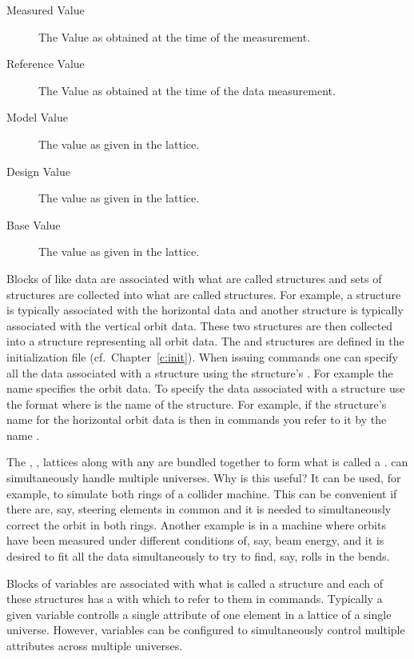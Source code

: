 \begin{description}
\begin{description}
\item[Measured Value] 
The Value as obtained at the time of the  measurement.
\item[Reference Value] 
The Value as obtained at the time of the  data  measurement.
\item[Model Value]
The value as given in the  lattice.
\item[Design Value]
The value as given in the  lattice.
\item[Base Value]
The value as given in the  lattice.
\end{description}
\end{description}

Blocks of like data are associated with what are called 
structures and sets of  structures are collected into what
are called  structures. For example, a 
structure is typically associated with the horizontal data and another
 structure is typically associated with the vertical orbit
data. These two structures are then collected into a 
structure representing all orbit data. The  and
 structures are defined in the \tao initialization file
(cf.~Chapter~\ref{c:init}).  When issuing \tao commands one can
specify all the data associated with a  structure using the
 structure's .  For example the name  specifies the
orbit data. To specify the data associated with a 
structure use the format  where  is the
name of the  structure. For example, if the  structure's name
for the horizontal
orbit data is  then in \tao commands you refer to it by 
the name .

The , ,  lattices along with any
 are
bundled together to form what is called a . \tao can
simultaneously handle multiple universes. Why is this useful? It can
be used, for example, to simulate both rings of a collider
machine. This can be convenient if there are, say, steering elements
in common and it is needed to simultaneously correct the orbit in both
rings. Another example is in a machine where orbits have been measured
under different conditions of, say, beam energy, and it is desired to
fit all the data simultaneously to try to find, say, rolls in the
bends.

Blocks of variables are associated with what is called a
 structure and each of these structures has a 
with which to refer to them in \tao commands. Typically a given variable 
controlls a single attribute of one element in a  lattice
of a single universe. However, variables can be configured to simultaneously
control multiple attributes across multiple universes.

